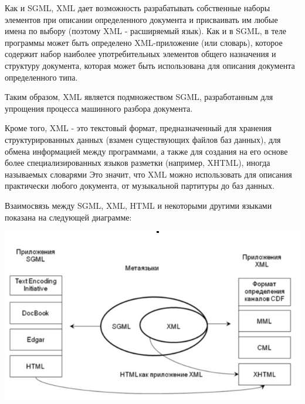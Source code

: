 \documentclass[12pt,a4paper,oneside]{article} %
\begin{document}
Как и SGML, XML дает возможность разрабатывать собственные наборы\linebreak
элементов при описании определенного документа и присваивать им\linebreak
любые имена по выбору (поэтому XML - расширяемый язык). Как и \linebreak
в SGML, в теле программы может быть определено XML-приложение \linebreak
(или словарь), которое содержит набор наиболее употребительных \linebreak
элементов общего назначения и структуру документа, которая \linebreak
может быть использована для описания документа определенного типа.

Таким образом,  XML является подмножеством SGML, разработанным \linebreak
для упрощения процесса машинного разбора документа.

Кроме того, XML - это текстовый формат, предназначенный для хранения \linebreak
структурированных данных (взамен существующих файлов баз данных), \linebreak
для обмена информацией между программами, а также для создания на его\linebreak
основе более специализированных языков разметки (например, XHTML), \linebreak
иногда называемых словарями Это значит, что XML можно использовать \linebreak
для описания практически любого документа, от музыкальной партитуры \linebreak
до баз данных.

Взаимосвязь между SGML, XML, HTML и некоторыми другими языками \linebreak
показана на следующей диаграмме:

\includegraphics[width=0.85\linewidth]{07-01}
\end{document}
